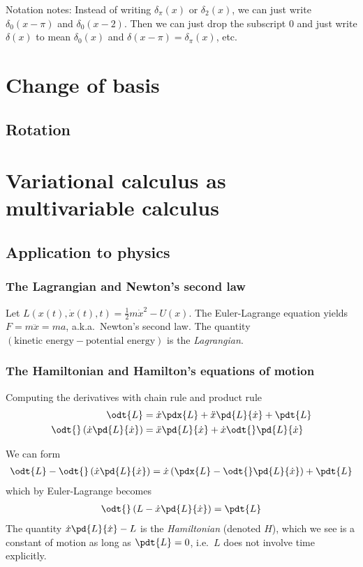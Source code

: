 \documentclass[12pt, oneside, letterpaper, fleqn]{article}
\begin{document}
Notation notes: Instead of writing $\delta_\pi(x)$ or $\delta_2(x)$, we
can just write $\delta_0(x-\pi)$ and $\delta_0(x-2)$. Then we can just
drop the subscript $0$ and just write $\delta(x)$ to mean $\delta_0(x)$
and $\delta(x-\pi) = \delta_\pi(x)$, etc.

\section{Change of basis}
\subsection{Rotation}


\section{Variational calculus as multivariable calculus}
\subsection{Application to physics}
\subsubsection{The Lagrangian and Newton's second law}
Let $L(x(t), \dot{x}(t), t) = \frac{1}{2}m\dot{x}^2 - U(x)$. The
Euler-Lagrange equation yields $F = m\ddot{x} = ma$, a.k.a.\ Newton's
second law. The quantity $(\text{kinetic energy} - \text{potential
energy})$ is the \emph{Lagrangian}.

\subsubsection{The Hamiltonian and Hamilton's equations of motion}
Computing the derivatives with chain rule and product rule
\begin{align*}
\odt{L} &= \dot{x}\pdx{L} + \ddot{x}\pd{L}{\dot{x}} + \pdt{L}\\
\odt{}\left(\dot{x}\pd{L}{\dot{x}}\right) &= \ddot{x}\pd{L}{\dot{x}} +
\dot{x}\odt{}\pd{L}{\dot{x}}
\end{align*}

We can form
\begin{align*}
\odt{L} - \odt{}\left(\dot{x}\pd{L}{\dot{x}}\right) =
\dot{x}\left(\pdx{L} - \odt{}\pd{L}{\dot{x}}\right) + \pdt{L}
\end{align*}
which by Euler-Lagrange becomes
\begin{align*}
\odt{}\left(L - \dot{x}\pd{L}{\dot{x}}\right) = \pdt{L}
\end{align*}
The quantity $\dot{x}\pd{L}{\dot{x}} - L$ is the
\emph{Hamiltonian} (denoted $H$), which we see is a constant of motion
as long as $\pdt{L} = 0$, i.e.\ $L$ does not involve time explicitly.
\end{document}
